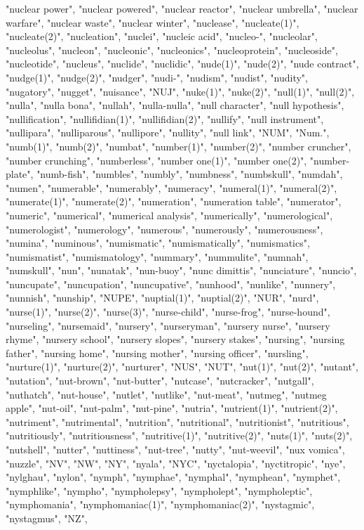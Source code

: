 "nuclear power",
"nuclear powered",
"nuclear reactor",
"nuclear umbrella",
"nuclear warfare",
"nuclear waste",
"nuclear winter",
"nuclease",
"nucleate(1)",
"nucleate(2)",
"nucleation",
"nuclei",
"nucleic acid",
"nucleo-",
"nucleolar",
"nucleolus",
"nucleon",
"nucleonic",
"nucleonics",
"nucleoprotein",
"nucleoside",
"nucleotide",
"nucleus",
"nuclide",
"nuclidic",
"nude(1)",
"nude(2)",
"nude contract",
"nudge(1)",
"nudge(2)",
"nudger",
"nudi-",
"nudism",
"nudist",
"nudity",
"nugatory",
"nugget",
"nuisance",
"NUJ",
"nuke(1)",
"nuke(2)",
"null(1)",
"null(2)",
"nulla",
"nulla bona",
"nullah",
"nulla-nulla",
"null character",
"null hypothesis",
"nullification",
"nullifidian(1)",
"nullifidian(2)",
"nullify",
"null instrument",
"nullipara",
"nulliparous",
"nullipore",
"nullity",
"null link",
"NUM",
"Num.",
"numb(1)",
"numb(2)",
"numbat",
"number(1)",
"number(2)",
"number cruncher",
"number crunching",
"numberless",
"number one(1)",
"number one(2)",
"number-plate",
"numb-fish",
"numbles",
"numbly",
"numbness",
"numbskull",
"numdah",
"numen",
"numerable",
"numerably",
"numeracy",
"numeral(1)",
"numeral(2)",
"numerate(1)",
"numerate(2)",
"numeration",
"numeration table",
"numerator",
"numeric",
"numerical",
"numerical analysis",
"numerically",
"numerological",
"numerologist",
"numerology",
"numerous",
"numerously",
"numerousness",
"numina",
"numinous",
"numismatic",
"numismatically",
"numismatics",
"numismatist",
"numismatology",
"nummary",
"nummulite",
"numnah",
"numskull",
"nun",
"nunatak",
"nun-buoy",
"nunc dimittis",
"nunciature",
"nuncio",
"nuncupate",
"nuncupation",
"nuncupative",
"nunhood",
"nunlike",
"nunnery",
"nunnish",
"nunship",
"NUPE",
"nuptial(1)",
"nuptial(2)",
"NUR",
"nurd",
"nurse(1)",
"nurse(2)",
"nurse(3)",
"nurse-child",
"nurse-frog",
"nurse-hound",
"nurseling",
"nursemaid",
"nursery",
"nurseryman",
"nursery nurse",
"nursery rhyme",
"nursery school",
"nursery slopes",
"nursery stakes",
"nursing",
"nursing father",
"nursing home",
"nursing mother",
"nursing officer",
"nursling",
"nurture(1)",
"nurture(2)",
"nurturer",
"NUS",
"NUT",
"nut(1)",
"nut(2)",
"nutant",
"nutation",
"nut-brown",
"nut-butter",
"nutcase",
"nutcracker",
"nutgall",
"nuthatch",
"nut-house",
"nutlet",
"nutlike",
"nut-meat",
"nutmeg",
"nutmeg apple",
"nut-oil",
"nut-palm",
"nut-pine",
"nutria",
"nutrient(1)",
"nutrient(2)",
"nutriment",
"nutrimental",
"nutrition",
"nutritional",
"nutritionist",
"nutritious",
"nutritiously",
"nutritiousness",
"nutritive(1)",
"nutritive(2)",
"nuts(1)",
"nuts(2)",
"nutshell",
"nutter",
"nuttiness",
"nut-tree",
"nutty",
"nut-weevil",
"nux vomica",
"nuzzle",
"NV",
"NW",
"NY",
"nyala",
"NYC",
"nyctalopia",
"nyctitropic",
"nye",
"nylghau",
"nylon",
"nymph",
"nymphae",
"nymphal",
"nymphean",
"nymphet",
"nymphlike",
"nympho",
"nympholepsy",
"nympholept",
"nympholeptic",
"nymphomania",
"nymphomaniac(1)",
"nymphomaniac(2)",
"nystagmic",
"nystagmus",
"NZ",
